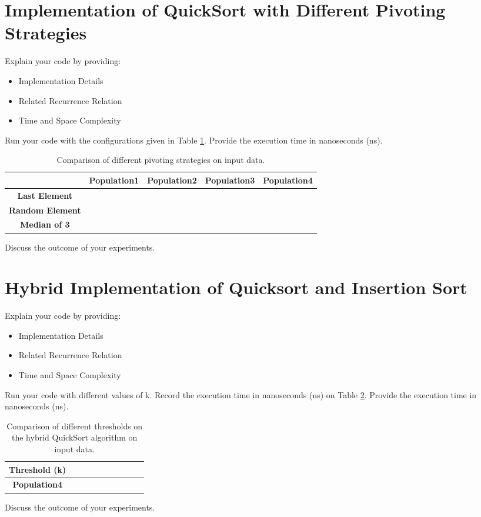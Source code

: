 \label{implementation}
\section{Implementation of QuickSort with Different Pivoting Strategies}
Explain your code by providing: 
\begin{itemize}
    \item Implementation Details
    \item Related Recurrence Relation
    \item Time and Space Complexity
\end{itemize}

Run your code with the configurations given in Table \ref{table:part1}. Provide the execution time in nanoseconds (ns). 

\begin{table}[h!]
\centering
\begin{tabular}{|c|c|c|c|c|}
\hline
                        & \textbf{Population1} & \textbf{Population2} & \textbf{Population3} & \textbf{Population4} \\ \hline
\textbf{Last Element}   &                    & & &                    \\ \hline
\textbf{Random Element} &                    & & &                   \\ \hline
\textbf{Median of 3}    &                    &  & &                  \\ \hline
\end{tabular}
\caption{Comparison of different pivoting strategies on input data. }
\label{table:part1}
\end{table}

Discuss the outcome of your experiments. 

\section{Hybrid Implementation of Quicksort and Insertion Sort}

Explain your code by providing: 
\begin{itemize}
    \item Implementation Details
    \item Related Recurrence Relation
    \item Time and Space Complexity
\end{itemize}

Run your code with different values of k. Record the execution time in nanoseconds (ns) on Table \ref{table:part3}. Provide the execution time in nanoseconds (ns). 

\begin{table}[h!]
\centering
\begin{tabular}{|c|c|c|c|c|c|c|c|c|c|}
\hline
\textbf{Threshold (k)} &  &  &  &  &  &  &  &  &  \\ \hline
\textbf{Population4}     &  &  &  &  &  &  &  &  &  \\ \hline
\end{tabular}
\caption{Comparison of different thresholds on the hybrid QuickSort algorithm on input data. }
\label{table:part3}
\end{table}

Discuss the outcome of your experiments. 

